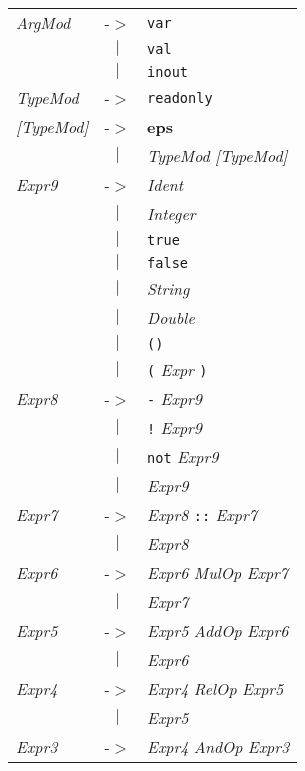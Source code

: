 \documentclass{article}
\begin{document}
\begin{center}
\begin{tabular}{lll}
\textit{ArgMod} & -$>$ & \texttt{var} \\
 & \multicolumn{1}{c}{\textbf{$|$}} & \texttt{val} \\
 & \multicolumn{1}{c}{\textbf{$|$}} & \texttt{inout} \\
\textit{TypeMod} & -$>$ & \texttt{readonly} \\
\textit{[TypeMod]} & -$>$ & \textbf{eps} \\
 & \multicolumn{1}{c}{\textbf{$|$}} & \textit{TypeMod} \textit{[TypeMod]} \\
\textit{Expr9} & -$>$ & \textit{Ident} \\
 & \multicolumn{1}{c}{\textbf{$|$}} & \textit{Integer} \\
 & \multicolumn{1}{c}{\textbf{$|$}} & \texttt{true} \\
 & \multicolumn{1}{c}{\textbf{$|$}} & \texttt{false} \\
 & \multicolumn{1}{c}{\textbf{$|$}} & \textit{String} \\
 & \multicolumn{1}{c}{\textbf{$|$}} & \textit{Double} \\
 & \multicolumn{1}{c}{\textbf{$|$}} & \texttt{()} \\
 & \multicolumn{1}{c}{\textbf{$|$}} & \texttt{(} \textit{Expr} \texttt{)} \\
\textit{Expr8} & -$>$ & \texttt{-} \textit{Expr9} \\
 & \multicolumn{1}{c}{\textbf{$|$}} & \texttt{!} \textit{Expr9} \\
 & \multicolumn{1}{c}{\textbf{$|$}} & \texttt{not} \textit{Expr9} \\
 & \multicolumn{1}{c}{\textbf{$|$}} & \textit{Expr9} \\
\textit{Expr7} & -$>$ & \textit{Expr8} \texttt{::} \textit{Expr7} \\
 & \multicolumn{1}{c}{\textbf{$|$}} & \textit{Expr8} \\
\textit{Expr6} & -$>$ & \textit{Expr6} \textit{MulOp} \textit{Expr7} \\
 & \multicolumn{1}{c}{\textbf{$|$}} & \textit{Expr7} \\
\textit{Expr5} & -$>$ & \textit{Expr5} \textit{AddOp} \textit{Expr6} \\
 & \multicolumn{1}{c}{\textbf{$|$}} & \textit{Expr6} \\
\textit{Expr4} & -$>$ & \textit{Expr4} \textit{RelOp} \textit{Expr5} \\
 & \multicolumn{1}{c}{\textbf{$|$}} & \textit{Expr5} \\
\textit{Expr3} & -$>$ & \textit{Expr4} \textit{AndOp} \textit{Expr3} \\

\end{tabular}
\end{center}
\end{document}
